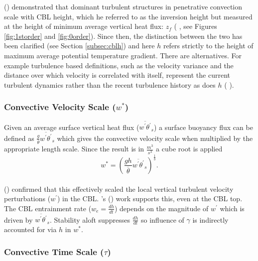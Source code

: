 \citeauthor{Deardorff72} (\citeyear{Deardorff72}) demonstrated that dominant turbulent structures in penetrative convection scale with \acs{CBL} height, which he referred to as the inversion height but measured at the height of minimum average vertical heat flux: $z_{f}$ (\citeauthor{DearWill80} \citeyear{DearWill80}, see Figures \ref{fig:1storder} and \ref{fig:0order}).  Since then, the distinction between the two has been clarified (see Section \ref{subsec:cblh}) and here $h$ refers strictly to the height of maximum average potential temperature gradient. There are alternatives. For example turbulence based definitions, such as the velocity variance and the distance over which velocity is correlated with itself, represent the current turbulent dynamics rather than the recent turbulence history as does $h$ (\citeauthor{Traum11} \citeyear{Traum11}).\\

\subsubsection{Convective Velocity Scale ($w^{*}$)}
\label{subsubsec:convel}

Given an average surface vertical heat flux ($\overline{w^{'}\theta^{'}}_{s}$) a surface buoyancy flux can be defined as $\frac{g}{\overline{\theta}}\overline{w^{'}\theta^{'}}_{s}$ which gives the convective velocity scale when multiplied by the appropriate length scale.  Since the result is in $\frac{m^{3}}{s^{3}}$ a cube root is applied\\

\begin{equation}
w^{*} = \left( \frac{gh}{\overline{\theta}}\overline{w^{'}\theta^{'}}_{s} \right)^{\frac{1}{3}}.
\end{equation}\\

\citeauthor{Deardorff70} (\citeyear{Deardorff70}) confirmed that this effectively scaled the local vertical turbulent velocity perturbations ($w^{'}$) in the \acs{CBL}.  \citeauthor{Sorbjan}'s (\citeyear{Sorbjan}) work supports this, even at the \acs{CBL} top.  The \acs{CBL} entrainment rate ($w_{e} = \frac{dh}{dt}$) depends on the magnitude of $w^{'}$ which is driven by $\overline{w^{'}\theta^{'}}_{s}$. Stability aloft suppresses $\frac{dh}{dt}$ so influence of $\gamma$ is indirectly accounted for via $h$ in $w^{*}$.\\

\subsubsection{Convective Time Scale ($\tau$)}
\label{subsubsec:}

